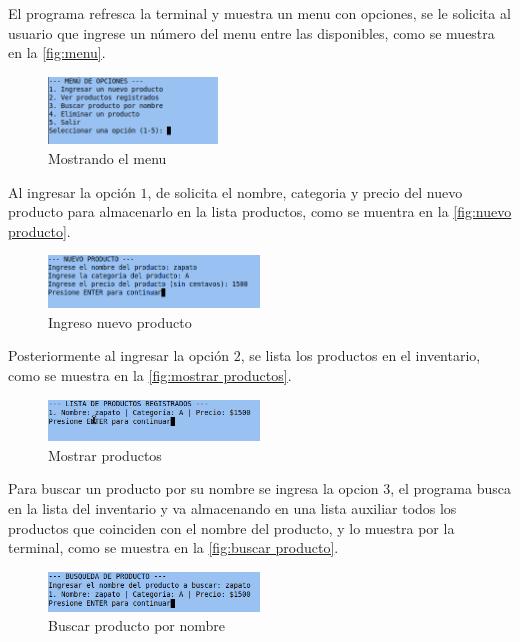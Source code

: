 \documentclass[12pt]{article}
\begin{document}
El programa refresca la terminal y muestra un menu con opciones, se le solicita al usuario que ingrese un número del menu entre las disponibles, como se muestra en la \autoref{fig:menu}.

\begin{figure}[H]
	\centering
	\setlength{\fboxrule}{0pt}
	\includegraphics[width=0.4\textwidth]{Imagenes/img1.png}
	\caption{Mostrando el menu}
	\label{fig:menu}
\end{figure} 

Al ingresar la opción $1$, de solicita el nombre, categoria y precio del nuevo producto para almacenarlo en la lista productos, como se muentra en la \autoref{fig:nuevo producto}.

\begin{figure}[H]
	\centering
	\setlength{\fboxrule}{0pt}
	\includegraphics[width=0.5\textwidth]{Imagenes/img2.png}
	\caption{Ingreso nuevo producto}
	\label{fig:nuevo producto}
\end{figure} 

Posteriormente al ingresar la opción $2$, se lista los productos en el inventario, como se muestra en la \autoref{fig:mostrar productos}.

\begin{figure}[H]
	\centering
	\setlength{\fboxrule}{0pt}
	\includegraphics[width=0.5\textwidth]{Imagenes/img3.png}
	\caption{Mostrar productos}
	\label{fig:mostrar productos}
\end{figure} 

Para buscar un producto por su nombre se ingresa la opcion $3$, el programa busca en la lista del inventario y va almacenando en una lista auxiliar todos los productos que coinciden con el nombre del producto, y lo muestra por la terminal, como se muestra en la \autoref{fig:buscar producto}.

\begin{figure}[H]
	\centering
	\setlength{\fboxrule}{0pt}
	\includegraphics[width=0.5\textwidth]{Imagenes/img4.png}
	\caption{Buscar producto por nombre}
	\label{fig:buscar producto}
\end{figure} 
\end{document}
